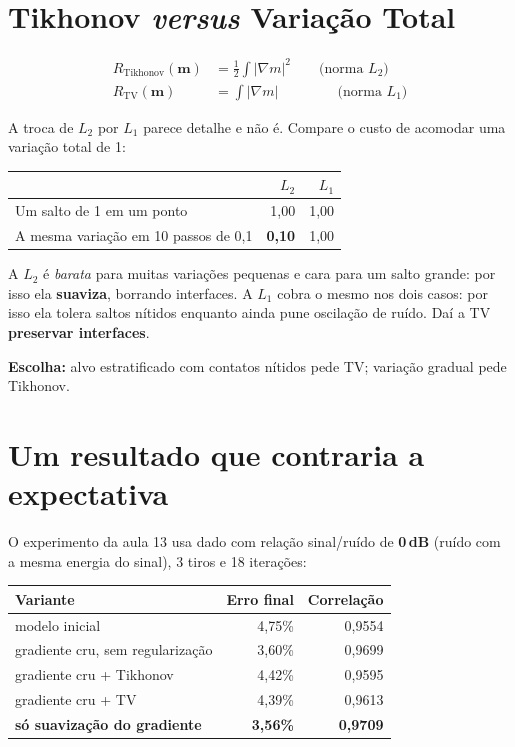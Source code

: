 \documentclass[11pt,a4paper,oneside]{report}
\begin{document}
\section{Tikhonov \emph{versus} Variação Total}

\begin{align}
R_{\text{Tikhonov}}(\mathbf{m}) &= \tfrac{1}{2}\int |\nabla m|^{2}
  \qquad\text{(norma }L_2) \\
R_{\text{TV}}(\mathbf{m}) &= \int |\nabla m|
  \qquad\qquad\ \text{(norma }L_1)
\end{align}

A troca de $L_2$ por $L_1$ parece detalhe e não é. Compare o custo de
acomodar uma variação total de 1:

\begin{center}
\begin{tabular}{@{}lrr@{}}
\toprule
 & $L_2$ & $L_1$ \\
\midrule
Um salto de 1 em um ponto & 1{,}00 & 1{,}00 \\
A mesma variação em 10 passos de 0{,}1 & \textbf{0{,}10} & 1{,}00 \\
\bottomrule
\end{tabular}
\end{center}

A $L_2$ é \emph{barata} para muitas variações pequenas e cara para um salto
grande: por isso ela \textbf{suaviza}, borrando interfaces. A $L_1$ cobra o
mesmo nos dois casos: por isso ela tolera saltos nítidos enquanto ainda pune
oscilação de ruído. Daí a TV \textbf{preservar interfaces}.

\textbf{Escolha:} alvo estratificado com contatos nítidos pede TV; variação
gradual pede Tikhonov.

\section{Um resultado que contraria a expectativa}

O experimento da aula 13 usa dado com relação sinal/ruído de \textbf{0\,dB}
(ruído com a mesma energia do sinal), 3 tiros e 18 iterações:

\begin{center}
\begin{tabular}{@{}lrr@{}}
\toprule
\textbf{Variante} & \textbf{Erro final} & \textbf{Correlação} \\
\midrule
modelo inicial                 & 4{,}75\% & 0{,}9554 \\
gradiente cru, sem regularização & 3{,}60\% & 0{,}9699 \\
gradiente cru + Tikhonov       & 4{,}42\% & 0{,}9595 \\
gradiente cru + TV             & 4{,}39\% & 0{,}9613 \\
\textbf{só suavização do gradiente} & \textbf{3{,}56\%} & \textbf{0{,}9709} \\
\bottomrule
\end{tabular}
\end{center}
\end{document}
